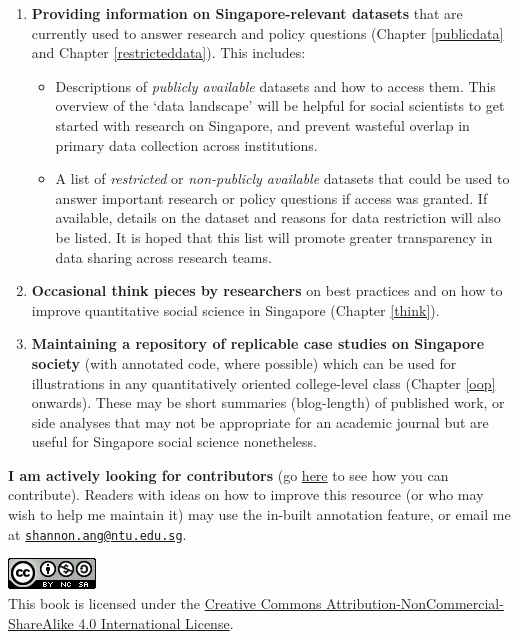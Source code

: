 \documentclass[openany]{book}
\providecommand{\tightlist}{%
  \setlength{\itemsep}{0pt}\setlength{\parskip}{0pt}}
\begin{document}
\begin{enumerate}
\def\labelenumi{\arabic{enumi}.}
\tightlist
\item
  \textbf{Providing information on Singapore-relevant datasets} that are
  currently used to answer research and policy questions (Chapter
  \ref{publicdata} and Chapter \ref{restricteddata}). This includes:

  \begin{itemize}
  \tightlist
  \item
    Descriptions of \emph{publicly available} datasets and how to access
    them. This overview of the `data landscape' will be helpful for
    social scientists to get started with research on Singapore, and
    prevent wasteful overlap in primary data collection across
    institutions.
  \item
    A list of \emph{restricted} or \emph{non-publicly available}
    datasets that could be used to answer important research or policy
    questions if access was granted. If available, details on the
    dataset and reasons for data restriction will also be listed. It is
    hoped that this list will promote greater transparency in data
    sharing across research teams.
  \end{itemize}
\item
  \textbf{Occasional think pieces by researchers} on best practices and
  on how to improve quantitative social science in Singapore (Chapter
  \ref{think}).
\item
  \textbf{Maintaining a repository of replicable case studies on
  Singapore society} (with annotated code, where possible) which can be
  used for illustrations in any quantitatively oriented college-level
  class (Chapter \ref{oop} onwards). These may be short summaries
  (blog-length) of published work, or side analyses that may not be
  appropriate for an academic journal but are useful for Singapore
  social science nonetheless.
\end{enumerate}

\textbf{I am actively looking for contributors} (go
\href{https://sg-numbers.netlify.com/how-to-contribute.html}{here} to
see how you can contribute). Readers with ideas on how to improve this
resource (or who may wish to help me maintain it) may use the in-built
annotation feature, or email me at
\href{mailto:shannon.ang@ntu.edu.sg}{\nolinkurl{shannon.ang@ntu.edu.sg}}.

\includegraphics{images/cc.png}\\
This book is licensed under the
\href{http://creativecommons.org/licenses/by-nc-sa/4.0/}{Creative
Commons Attribution-NonCommercial-ShareAlike 4.0 International License}.
\end{document}
